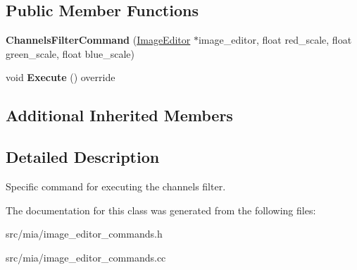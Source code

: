 \subsection*{Public Member Functions}
\begin{DoxyCompactItemize}
\item 
\mbox{\label{classimage__tools_1_1ChannelsFilterCommand_a7fd606c74e4855cc9a886524d89ff743}} 
{\bfseries Channels\+Filter\+Command} (\hyperlink{classimage__tools_1_1ImageEditor}{Image\+Editor} $\ast$image\+\_\+editor, float red\+\_\+scale, float green\+\_\+scale, float blue\+\_\+scale)
\item 
\mbox{\label{classimage__tools_1_1ChannelsFilterCommand_aeb73190ed2ee6b86dc641c1fe4e0c728}} 
void {\bfseries Execute} () override
\end{DoxyCompactItemize}
\subsection*{Additional Inherited Members}


\subsection{Detailed Description}
Specific command for executing the channels filter. 

The documentation for this class was generated from the following files\+:\begin{DoxyCompactItemize}
\item 
src/mia/image\+\_\+editor\+\_\+commands.\+h\item 
src/mia/image\+\_\+editor\+\_\+commands.\+cc\end{DoxyCompactItemize}
